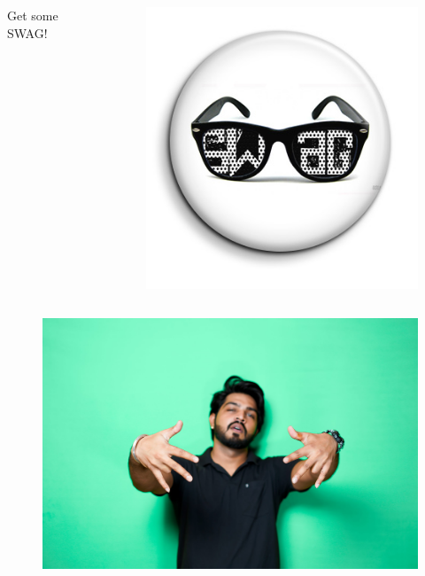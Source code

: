 \documentclass{beamer}
\begin{document}
\begin{frame}
    \begin{columns}
        \begin{column}{0.3\textwidth}
            Get some SWAG!
        \end{column}
        \begin{column}{0.7\textwidth}
            \begin{figure}
                \centering
                \includegraphics[width=\textwidth,keepaspectratio]{../resources/wrong_swag.jpg}
            \end{figure}
        \end{column}
    \end{columns}
\end{frame}


\begin{frame}
    \begin{figure}
        \centering
        \includegraphics[width=\textwidth,keepaspectratio]{../resources/wrong_swag2.jpg}
    \end{figure}
\end{frame}
\end{document}
